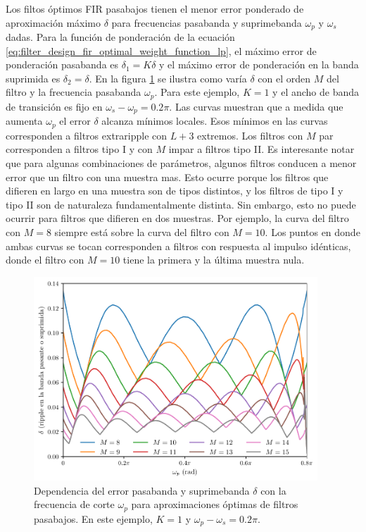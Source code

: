 \documentclass[a4paper]{report}
\begin{document}
Los filtos óptimos FIR pasabajos tienen el menor error ponderado de aproximación máximo \(\delta\) para frecuencias pasabanda y suprimebanda \(\omega_p\) y \(\omega_s\) dadas. Para la función de ponderación de la ecuación \ref{eq:filter_design_fir_optimal_weight_function_lp}, el máximo error de ponderación pasabanda es \(\delta_1=K\delta\) y el máximo error de ponderación en la banda suprimida es \(\delta_2=\delta\). En la figura \ref{fig:filter_design_fir_optimal_pm_characteristics} se ilustra como varía \(\delta\) con el orden \(M\) del filtro y la frecuencia pasabanda \(\omega_p\). Para este ejemplo, \(K=1\) y el ancho de banda de transición es fijo en \(\omega_s-\omega_p=0.2\pi\). Las curvas muestran que a medida que aumenta \(\omega_p\) el error \(\delta\) alcanza mínimos locales. Esos mínimos en las curvas corresponden a filtros extraripple con \(L+3\) extremos. Los filtros con \(M\) par corresponden a filtros tipo I y con \(M\) impar a filtros tipo II. Es interesante notar que para algunas combinaciones de parámetros, algunos filtros conducen a menor error que un filtro con una muestra mas. Esto ocurre porque los filtros que difieren en largo en una muestra son de tipos distintos, y los filtros de tipo I y tipo II son de naturaleza fundamentalmente distinta. Sin embargo, esto no puede ocurrir para filtros que difieren en dos muestras. Por ejemplo, la curva del filtro con \(M=8\) siempre está sobre la curva del filtro con \(M=10\). Los puntos en donde ambas curvas se tocan corresponden a filtros con respuesta al impulso idénticas, donde el filtro con \(M=10\) tiene la primera y la última muestra nula.
\begin{figure}[!htb]
 \begin{center}
 \includegraphics[width=0.95\textwidth]{figuras/filter_design_fir_optimal_pm_characteristics.pdf}
 \caption{\label{fig:filter_design_fir_optimal_pm_characteristics} Dependencia del error pasabanda y suprimebanda \(\delta\) con la frecuencia de corte \(\omega_p\) para aproximaciones óptimas de filtros pasabajos. En este ejemplo, \(K=1\) y \(\omega_p-\omega_s=0.2\pi\).}
 \end{center}
\end{figure}
\end{document}
